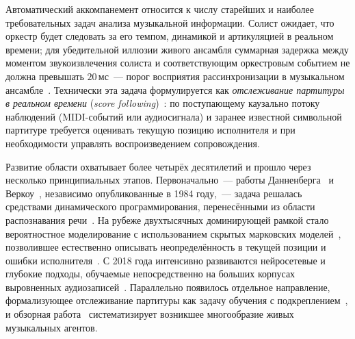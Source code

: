 %
Автоматический аккомпанемент относится к числу старейших и наиболее
требовательных задач анализа музыкальной информации. Солист ожидает,
что оркестр будет следовать за его темпом, динамикой и артикуляцией
в реальном времени; для убедительной иллюзии живого ансамбля
суммарная задержка между моментом звукоизвлечения солиста и
соответствующим оркестровым событием не должна превышать
$20$\,мс~--- порог восприятия рассинхронизации в музыкальном
ансамбле~\cite{Vercoe1984,Cont2010}. Технически эта задача
формулируется как \textit{отслеживание партитуры в реальном
времени} (\textit{score following})~\cite{Dannenberg1984}: по
поступающему каузально потоку наблюдений (MIDI-событий или
аудиосигнала) и заранее известной символьной партитуре требуется
оценивать текущую позицию исполнителя и при необходимости
управлять воспроизведением сопровождения.

Развитие области охватывает более четырёх десятилетий и
прошло через несколько принципиальных этапов. Первоначально~---
работы Данненберга~\cite{Dannenberg1984} и Веркоу~\cite{Vercoe1984},
независимо опубликованные в 1984 году,~--- задача решалась средствами
динамического программирования, перенесёнными из области
распознавания речи~\cite{SakoeChiba1978}. На рубеже двухтысячных
доминирующей рамкой стало вероятностное моделирование с использованием
скрытых марковских моделей~\cite{Rabiner1989}, позволившее
естественно описывать неопределённость в текущей позиции и
ошибки исполнителя~\cite{OrioDechelle2001,Raphael2010,Cont2010,
Nakamura2015}. С 2018 года интенсивно развиваются нейросетевые и
глубокие подходы, обучаемые непосредственно на больших корпусах
выровненных аудиозаписей~\cite{Hawthorne2018,Hawthorne2019Maestro,
Henkel2021}. Параллельно появилось отдельное направление,
формализующее отслеживание партитуры как задачу обучения с
подкреплением~\cite{Dorfer2018RL,Jiang2020RLDuet,Peter2023,
Wu2024ReaLchords}, и обзорная работа~\cite{Kim2026LiveAgents}
систематизирует возникшее многообразие живых музыкальных
агентов.

